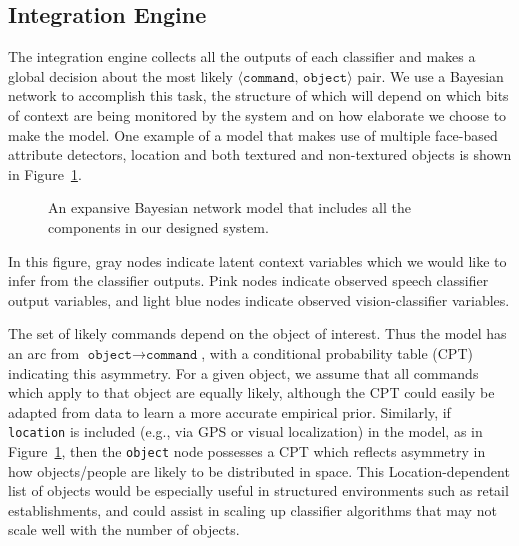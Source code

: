 \documentclass{llncs}
\begin{document}
\subsection{Integration Engine}
The integration engine collects all the outputs of each classifier and
makes a global decision about the most likely $\langle
\texttt{command, object}\rangle$ pair. We use a Bayesian network
to accomplish this task, the structure of which  will depend on
which bits of context are being monitored by the system and on how
elaborate we choose to make the model. One example of a model
that makes use of multiple face-based attribute detectors, location
and both textured and non-textured objects is shown in
Figure~\ref{fig:bn_full}.
\begin{figure} [t]
\caption{An expansive Bayesian network model that includes all the components in our designed system.}
\label{fig:bn_full}
\end{figure}
In this figure, gray nodes indicate latent context variables which we
would like to infer from the classifier outputs. Pink nodes indicate
observed speech classifier output variables, and light blue nodes
indicate observed vision-classifier variables.

The set of likely commands depend on the object of interest. Thus the
model has an arc from $\texttt{object}\rightarrow \texttt{command}$, with a conditional
probability table (CPT) indicating this asymmetry. For a given object,
we assume that all commands which apply to that object are equally
likely, although the CPT could easily be adapted from data to learn a
more accurate empirical prior. Similarly, if \texttt{location} is
included (e.g., via GPS or visual localization) in the model, as in Figure~\ref{fig:bn_full}, then the \texttt{object} node possesses a CPT which reflects asymmetry in how
objects/people are likely to be distributed in space. This
Location-dependent list of objects would be especially useful in
structured environments such as retail establishments, and could
assist in scaling up classifier algorithms that may not scale well
with the number of objects.
\end{document}
